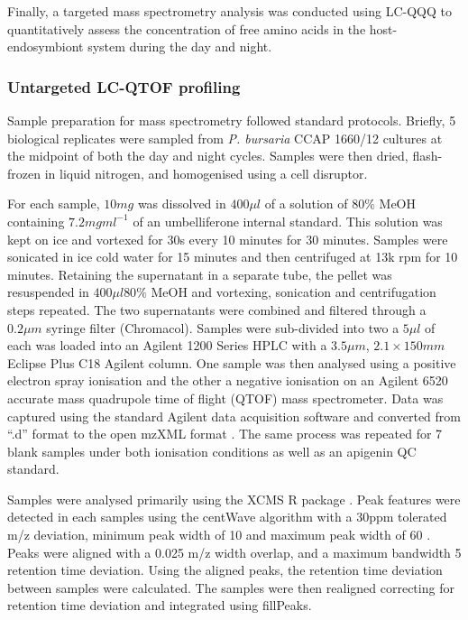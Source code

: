 Finally, a targeted mass spectrometry analysis was conducted using
LC-QQQ to quantitatively assess the concentration of free amino acids
in the host-endosymbiont system during the day and night.

\subsubsection{Untargeted LC-QTOF profiling}

Sample preparation for mass spectrometry followed standard protocols.
Briefly, 5 biological replicates were sampled from \textit{P. bursaria} CCAP 1660/12 
cultures at the midpoint of both the day and night cycles. 
Samples were then dried, flash-frozen in liquid nitrogen, and homogenised
using a cell disruptor. 

For each sample, \(10mg\) was dissolved in \(400\mu l\)
of a solution of \(80\%\) MeOH containing \(7.2mg ml^{-1}\) of
an umbelliferone internal standard.  This solution was kept on ice
and vortexed for 30s every 10 minutes for 30 minutes.
Samples were sonicated in ice cold water for 15 minutes and then centrifuged
at 13k rpm for 10 minutes.  Retaining the supernatant in a separate tube, the pellet
was resuspended in \(400\mu l 80\%\) MeOH and vortexing, sonication and centrifugation
steps repeated.  The two supernatants were combined and filtered through 
a \(0.2\mu m\) syringe filter (Chromacol).  Samples were sub-divided into two 
a \(5\mu l\) of each was loaded into an Agilent 1200 Series HPLC with
a \(3.5\mu m\), \(2.1\times 150mm\) Eclipse Plus C18 Agilent column.
One sample was then analysed using a positive electron spray ionisation
and the other a negative ionisation on an Agilent 6520 accurate mass
quadrupole time of flight (QTOF) mass spectrometer. Data was captured
using the standard Agilent data acquisition software and converted
from ``.d'' format to the open mzXML format \citep{Pedrioli2004}.
The same process was repeated for 7 blank samples under both ionisation conditions
as well as an apigenin QC standard.

Samples were analysed primarily using the XCMS R package \citep{Smith2006,Tautenhahn2012}.
Peak features were detected in each samples using the centWave algorithm with a 30ppm tolerated m/z deviation,
minimum peak width of 10 and maximum peak width of 60 \citep{Tautenhahn2008}. 
Peaks were aligned with a 0.025 m/z width overlap, and a maximum bandwidth 5 retention time
deviation. Using the aligned peaks, the retention time deviation between samples were
calculated.  The samples were then realigned correcting for retention time deviation and
integrated using fillPeaks. 


